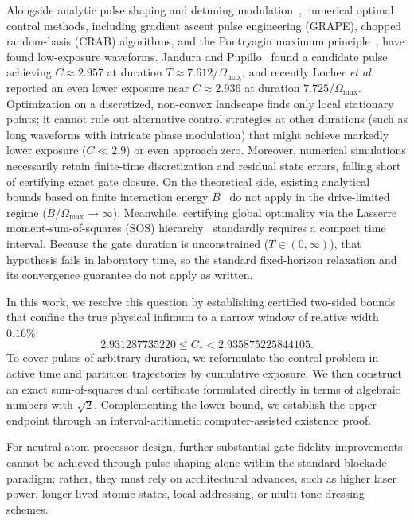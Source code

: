 \documentclass[aps,prx,reprint,nofootinbib,longbibliography,floatfix]{revtex4-2}
\theoremstyle{plain}
\theoremstyle{remark}
\newcommand{\Omax}{\Omega_{\max}}
\begin{document}
Alongside analytic pulse shaping and detuning modulation~\cite{Theis16,Shi17,Shi19}, numerical optimal control methods, including gradient ascent pulse engineering (GRAPE), chopped random-basis (CRAB) algorithms, and the Pontryagin maximum principle~\cite{Khaneja05,Caneva11,Koch22}, have found low-exposure waveforms. Jandura and Pupillo~\cite{JP22} found a candidate pulse achieving $C \approx 2.957$ at duration $T \approx 7.612/\Omax$, and recently Locher \emph{et al.}~\cite{Locher25} reported an even lower exposure near $C \approx 2.936$ at duration $7.725/\Omax$. Optimization on a discretized, non-convex landscape finds only local stationary points; it cannot rule out alternative control strategies at other durations (such as long waveforms with intricate phase modulation) that might achieve markedly lower exposure ($C \ll 2.9$) or even approach zero. Moreover, numerical simulations necessarily retain finite-time discretization and residual state errors, falling short of certifying exact gate closure. On the theoretical side, existing analytical bounds based on finite interaction energy $B$~\cite{DDP25} do not apply in the drive-limited regime ($B/\Omax \to \infty$). Meanwhile, certifying global optimality via the Lasserre moment-sum-of-squares (SOS) hierarchy~\cite{Lasserre01,Lasserre08,Parrilo03,Putinar93} standardly requires a compact time interval. Because the gate duration is unconstrained ($T \in (0, \infty)$), that hypothesis fails in laboratory time, so the standard fixed-horizon relaxation and its convergence guarantee do not apply as written.

In this work, we resolve this question by establishing certified two-sided bounds that confine the true physical infimum to a narrow window of relative width $0.16\%$:
\begin{equation}
\boxed{2.931287735220\le C_*<2.935875225844105.}
\label{eq:headline}
\end{equation}
To cover pulses of arbitrary duration, we reformulate the control problem in active time and partition trajectories by cumulative exposure. We then construct an exact sum-of-squares dual certificate formulated directly in terms of algebraic numbers with $\sqrt{2}$. Complementing the lower bound, we establish the upper endpoint through an interval-arithmetic computer-assisted existence proof.

For neutral-atom processor design, further substantial gate fidelity improvements cannot be achieved through pulse shaping alone within the standard blockade paradigm; rather, they must rely on architectural advances, such as higher laser power, longer-lived atomic states, local addressing, or multi-tone dressing schemes.
\end{document}
